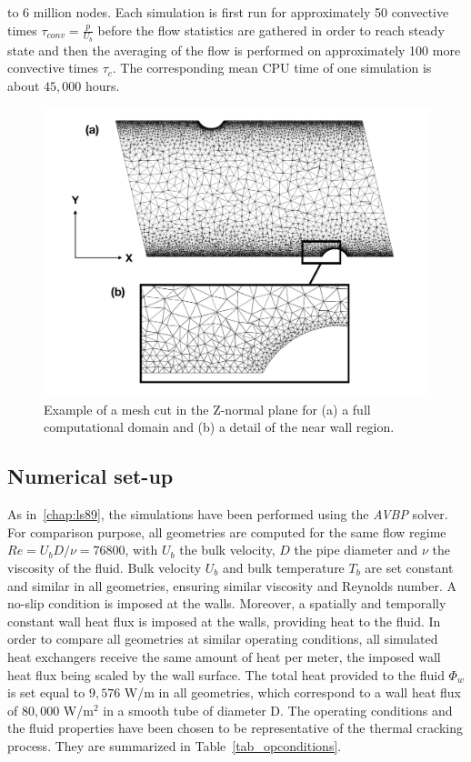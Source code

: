 to 6 million nodes. Each simulation is first run for approximately 50 convective times $\tau_{conv} = \frac{p}{U_b}$ before the flow statistics are gathered in order to reach steady state and then the averaging of the flow is performed on approximately 100 more convective times $\tau_c$. The corresponding mean CPU time of one simulation is about $45,000$ hours.\\  

\begin{figure}[ht]
\centering
\includegraphics[width=\linewidth]{fig/applications/optim/mert_mesh2.pdf}
\caption{Example of a mesh cut in the Z-normal plane for (a) a full computational domain and (b) a detail of the near wall region.}
\label{mesh}
\end{figure}

\subsection{Numerical set-up}

As in~\cref{chap:ls89}, the simulations have been performed using the \emph{AVBP} solver. For comparison purpose, all geometries are computed for the same flow regime $Re = U_b D / \nu = 76800$, with $U_b$ the bulk velocity, $D$ the pipe diameter and $\nu$ the viscosity of the fluid. Bulk velocity $U_b$ and bulk temperature $T_b$ are set constant and similar in all geometries, ensuring similar viscosity and Reynolds number. A no-slip condition is imposed at the walls. Moreover, a spatially and temporally constant wall heat flux is imposed at the walls, providing heat to the fluid. In order to compare all geometries at similar operating conditions, all simulated heat exchangers receive the same amount of heat per meter, the imposed wall heat flux being scaled by the wall surface. The total heat provided to the fluid $\Phi_w$ is set equal to $9,576$ W/m in all geometries, which correspond to a wall heat flux of $80,000$ W/m$^2$ in a smooth tube of diameter D. The operating conditions and the fluid properties have been chosen to be representative of the thermal cracking process. They are summarized in Table~\ref{tab_opconditions}.\\

